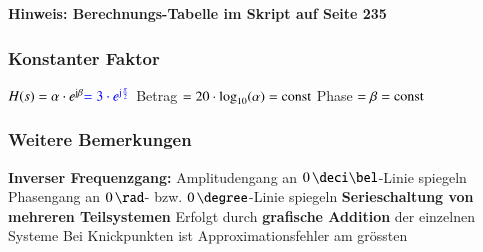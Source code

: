 \begin{minipage}[t]{0.48\columnwidth}
    
\end{minipage}
\hfill
\begin{minipage}[t]{0.48\columnwidth}
    
\end{minipage}

\textbf{Hinweis: Berechnungs-Tabelle im Skript auf Seite 235}

\begin{minipage}[t]{0.48\columnwidth}
    \raggedright
    \subsubsection{Konstanter Faktor}

    \begin{outline}
        \1 $H(s) = \alpha \cdot e^{\mathrm{j} \beta} {\color{blue}= 3 \cdot e^{\mathrm{j} \frac{\pi}{2}}}$
            \2 Betrag $= 20 \cdot \log_{10}(\alpha) = \mathrm{const}$
            \2 Phase $= \beta = \mathrm{const}$
    \end{outline}
    
    
\end{minipage}
\hfill
\begin{minipage}[t]{0.48\columnwidth}
    \raggedright
    \subsubsection{Weitere Bemerkungen}

    \begin{outline}
        \1 \textbf{Inverser Frequenzgang:}
            \2 Amplitudengang an $0 \, \deci \bel$-Linie spiegeln
            \2 Phasengang an $0 \, \rad$- bzw. $0 \, \degree$-Linie spiegeln
        \1 \textbf{Serieschaltung von mehreren Teilsystemen}
            \2 Erfolgt durch \textbf{grafische Addition} der einzelnen Systeme
        \1 Bei Knickpunkten ist Approximationsfehler am grössten
    \end{outline}

\end{minipage}




